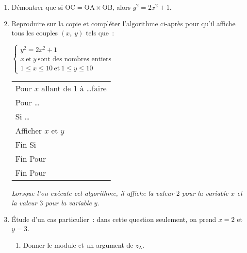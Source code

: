 \begin{enumerate}
     \item Démontrer que si $\text{OC} = \text{OA} \times \text{OB}$, alors $y^2 = 2x^2 + 1$.
     \item Reproduire sur la copie et compléter l'algorithme ci-après pour qu'il affiche tous les couples $(x,~y)$ tels que~:
     \begin{center}
          $\left\{\begin{array}{l}
                    y^2 = 2x^2 + 1\\
                    x~\text{et}~y~\text{sont des nombres entiers} \\
                    1  \leqslant x \leqslant 10 ~\text{et}~ 1 \leqslant y \leqslant 10
          \end{array}\right.$
     \end{center}
     \begin{center}
          \begin{extern}%
               \begin{tabular}{|l|}\hline
                    Pour $x$ allant de 1 à \ldots faire\\
                    \hspace{0.5cm}Pour \ldots\\
                    \hspace{1cm}Si \ldots\\
                    \hspace{1.5cm}Afficher $x$ et $y$\\
                    \hspace{1cm}Fin Si\\
                    \hspace{0.5cm}Fin Pour\\
                    Fin Pour\\ \hline
               \end{tabular}
          \end{extern}
     \end{center}
     \emph{Lorsque l'on exécute cet algorithme, il affiche la valeur $2$ pour la variable $x$ et la valeur $3$ pour la variable $y$.}
     \smallbreak
     \item Étude d'un cas particulier~: dans cette question seulement, on prend $x = 2$ et $y = 3$.
     \begin{enumerate}[label=\alph*.]
          \item Donner le module et un argument de $z_{\text{A}}$.

\end{enumerate}
\end{enumerate}

